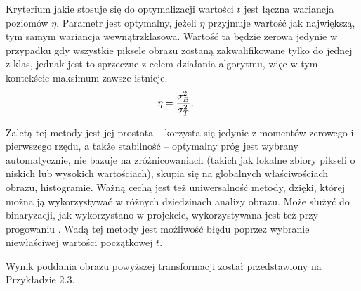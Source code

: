 \documentclass[eng,oneside]{mgr}
\begin{document}
Kryterium jakie stosuje się do optymalizacji wartości $t$ jest łączna wariancja poziomów $\eta$. Parametr jest optymalny, jeżeli $\eta$ przyjmuje wartość jak największą, tym samym wariancja wewnątrzklasowa. Wartość ta będzie zerowa jedynie w przypadku gdy wszystkie piksele obrazu zostaną zakwalifikowane tylko do jednej z klas, jednak jest to sprzeczne z celem działania algorytmu, więc w tym kontekście maksimum zawsze istnieje.
\begin{equation}
\eta=\frac{\sigma_B^2}{\sigma_T^2}, \hspace{0.5cm} 
\end{equation}
\par Zaletą tej metody jest jej prostota – korzysta się jedynie z momentów zerowego i pierwszego rzędu, a także stabilność – optymalny próg jest wybrany automatycznie, nie bazuje na zróżnicowaniach (takich jak lokalne zbiory pikseli o niskich lub wysokich wartościach), skupia się na globalnych właściwościach obrazu, histogramie. Ważną cechą jest też uniwersalność metody, dzięki, której można ją wykorzystywać w różnych dziedzinach analizy obrazu. Może służyć do binaryzacji, jak wykorzystano w projekcie, wykorzystywana jest też przy progowaniu \cite{binaryzacja}. Wadą tej metody jest możliwość błędu poprzez wybranie niewłaściwej wartości początkowej $t$. 
\par Wynik poddania obrazu powyższej transformacji został przedstawiony na Przykładzie 2.3.
\end{document}
